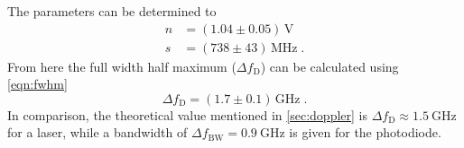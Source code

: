 The parameters can be determined to
\begin{align*}
    n &= (1.04 \pm 0.05)\, \text{V} \\
    s &= (738 \pm 43) \, \text{MHz}\; .
\end{align*}
From here the full width half maximum ($\Delta f_{\text{D}}$) can be calculated using \eqref{eqn:fwhm}
\begin{equation*}
    \Delta f_{\text{D}} = (1.7 \pm 0.1) \, \text{GHz}\; . 
\end{equation*}
In comparison, the theoretical value mentioned in \autoref{sec:doppler} is $\Delta f_\text{D} \approx \qty{1.5}{\giga\hertz}$ for a \HeNe laser, while a bandwidth
of $\Delta f_\text{BW} = \qty{0.9}{\giga\hertz}$ is given for the photodiode.
